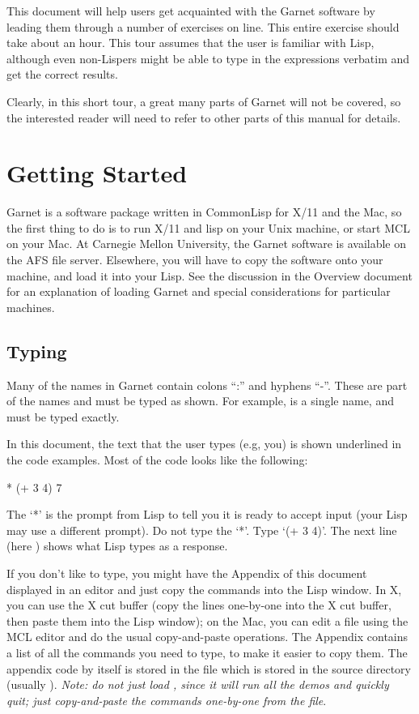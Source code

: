 This document will help users get acquainted with the Garnet software by
leading them through a number of exercises on line.  This entire exercise
should take about an hour.  This tour assumes that the user is familiar
with Lisp, although even non-Lispers might be able to type in the
expressions verbatim and get the correct results.

Clearly, in this short tour, a great many parts of Garnet will not be
covered, so the interested reader will need to refer to other parts of this
manual for details.

\chapter{Getting Started}
\label{startlisp}

Garnet is a software package written in CommonLisp for X/11 and the Mac,
so the first thing to do is to run X/11 and lisp on your Unix machine, or
start MCL on your Mac.  At Carnegie Mellon University, the Garnet
software is available on the AFS file server.  Elsewhere, you will
have to copy the software onto your machine, and load it into your
Lisp.  See the discussion in the Overview document for an explanation
of loading Garnet and special considerations for particular machines.


\section{Typing}
\label{typing}

Many of the names in Garnet contain colons ``:'' and hyphens ``-''.  These
are part of the names and must be typed as shown.  For example,
 is a single name, and must be typed exactly.

In this document, the text that the user types (e.g, you) is shown underlined
in the code examples.  Most of the code looks like the following:
\begin{programexample}
* (+ 3 4)
7
\end{programexample}
The `*' is the prompt from Lisp to tell you it is ready to accept input
(your Lisp may use a different prompt).
Do not type the `*'.  Type `(+ 3 4)'.  The next line (here )
shows what Lisp types as a response.

If you don't like to type, you might have the Appendix of this document
displayed in an editor and just copy the commands into the Lisp
window.  In X, you can use the X cut buffer (copy the lines one-by-one
into the X cut buffer, then paste them into the Lisp window);  on the
Mac, you can edit a file using the MCL editor and do the usual
copy-and-paste operations.
The Appendix contains a list of all the commands you need to
type, to make it easier to copy them.
The appendix code by itself is stored in
the file  which is stored in the  source
directory (usually ).
{\it Note: do
not just load , since it will run all the demos and quickly
quit; just copy-and-paste the commands one-by-one from the file}.

